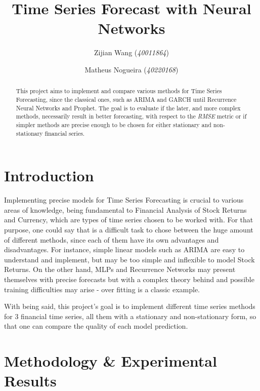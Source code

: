 \documentclass[10pt,twocolumn,letterpaper]{article}
\begin{document}
\title{Time Series Forecast with Neural Networks}
\author{Zijian Wang (\textit{40011864}) \and Matheus Nogueira (\textit{40220168})  }
\maketitle

\begin{abstract}
   This project aims to implement and compare various methods for Time Series Forecasting, since the classical ones, such as ARIMA and GARCH until Recurrence Neural Networks and Prophet. The goal is to evaluate if the later, and more complex methods, necessarily result in better forecasting, with respect to the \textit{RMSE} metric or if simpler methods are precise enough to be chosen for either stationary and non-stationary financial series.  
\end{abstract}

\section{Introduction}

Implementing precise models for Time Series Forecasting is crucial to various areas of knowledge, being fundamental to Financial Analysis of Stock Returns and Currency, which are types of time series chosen to be worked with. For that purpose, one could say that is a difficult task to chose between the huge amount of different methods, since each of them have its own advantages and disadvantages. For instance, simple linear models such as ARIMA are easy to understand and implement, but may be too simple and inflexible to model Stock Returns. On the other hand, MLPs and Recurrence Networks may present themselves with precise forecasts but with a complex theory behind and possible training difficulties may arise - over fitting is a classic example.

With being said, this project's goal is to implement different time series methods for 3 financial time series, all them with a stationary and non-stationary form, so that one can compare the quality of each model prediction.

\section{Methodology \& Experimental Results}
\end{document}
